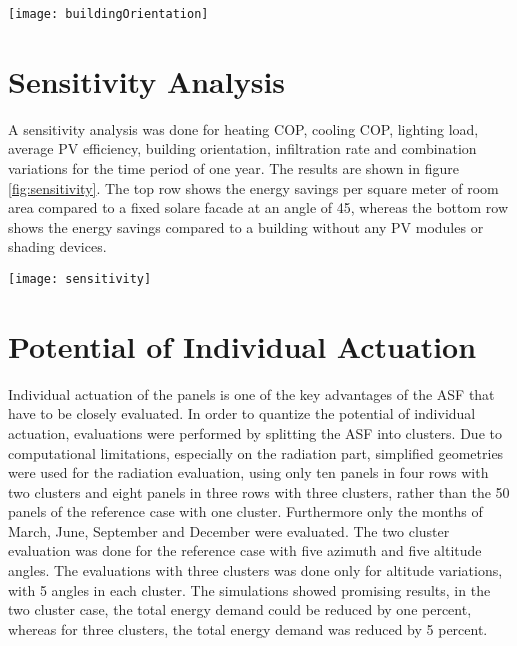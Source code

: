 	\begin{figure*}
	\begin{center}
	\texttt{[image: buildingOrientation]}
	\caption{Energy demand in dependence of building orientation. South facing facades perform best.}
	\label{fig:buildingOrientation}
	\end{center}
	\end{figure*}

\section{Sensitivity Analysis}

	A sensitivity analysis was done for heating COP, cooling COP, lighting load, average PV efficiency, building orientation, infiltration rate and combination variations for the time period of one year. The results are shown in figure \ref{fig:sensitivity}. The top row shows the energy savings per square meter of room area compared to a fixed solare facade at an angle of 45\degree, whereas the bottom row shows the energy savings compared to a building without any PV modules or shading devices. 

	\begin{figure*}
	\begin{center}
	\texttt{[image: sensitivity]}
	\caption{Sensitivity analysis of energy savings during one year. From left to right, sensitivities on heating COP, cooling COP, lighting load, average PV efficiency, building orientation, combination variations and infiltration rate. Top row shows the energy savings compared to a fixed solar facade at a 45\degree altitude angle, the bottom row shows the energy savings compared to a room without shading or PV modules.}
	\label{fig:sensitivity}
	\end{center}
	\end{figure*}

\section{Potential of Individual Actuation}
	Individual actuation of the panels is one of the key advantages of the ASF that have to be closely evaluated. In order to quantize the potential of individual actuation, evaluations were performed by splitting the ASF into clusters. Due to computational limitations, especially on the radiation part, simplified geometries were used for the radiation evaluation, using only ten panels in four rows with two clusters and eight panels in three rows with three clusters, rather than the 50 panels of the reference case with one cluster. Furthermore only the months of March, June, September and December were evaluated. The two cluster evaluation was done for the reference case with five azimuth and five altitude angles. The evaluations with three clusters was done only for altitude variations, with 5 angles in each cluster. The simulations showed promising results, in the two cluster case, the total energy demand could be reduced by one percent, whereas for three clusters, the total energy demand was reduced by 5 percent. 